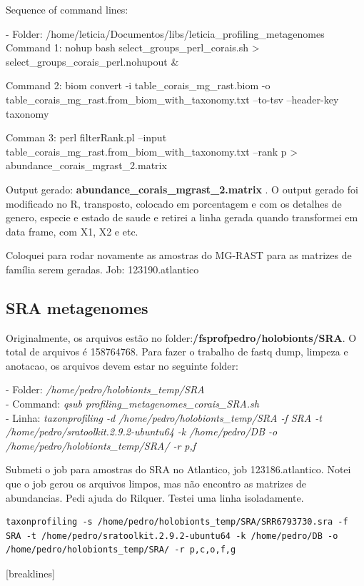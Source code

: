 \documentclass[12pt, a4paper]{report}
\begin{document}
Sequence of command lines:


\begin{tcolorbox}[width=6.7in]
- Folder: /home/leticia/Documentos/libs/leticia\_profiling\_metagenomes \\
Command 1: nohup  bash select\_groups\_perl\_corais.sh > select\_groups\_corais\_perl.nohupout \&

Command 2: biom convert -i table\_corais\_mg\_rast.biom -o table\_corais\_mg\_rast.from\_biom\_with\_taxonomy.txt --to-tsv --header-key taxonomy

Comman 3: perl filterRank.pl --input table\_corais\_mg\_rast.from\_biom\_with\_taxonomy.txt --rank p > abundance\_corais\_mgrast\_2.matrix
\end{tcolorbox}

Output gerado: \textbf{abundance\_corais\_mgrast\_2.matrix} . O output gerado foi modificado no R, transposto, colocado em porcentagem e com os detalhes de genero, especie e estado de saude e retirei a linha gerada quando transformei em data frame, com X1, X2 e etc. 

Coloquei para rodar novamente as amostras do MG-RAST para as matrizes de família serem geradas. Job: 123190.atlantico

\subsection{SRA metagenomes}
Originalmente, os arquivos estão no folder:\textbf {/fsprofpedro/holobionts/SRA}. O total de arquivos é 158764768. Para fazer o trabalho de fastq dump, limpeza e anotacao, os arquivos devem estar no seguinte folder:

\begin{tcolorbox}[width=6.3in]
- Folder: \textit{/home/pedro/holobionts\_temp/SRA} \\
- Command: \textit{qsub profiling\_metagenomes\_corais\_SRA.sh}\\
- Linha: \textit{taxonprofiling -d /home/pedro/holobionts\_temp/SRA -f SRA -t /home/pedro/sratoolkit.2.9.2-ubuntu64 -k /home/pedro/DB -o /home/pedro/holobionts\_temp/SRA/ -r p,f}
\end{tcolorbox}

Submeti o job para amostras do SRA no Atlantico, job 123186.atlantico.  Notei que o job gerou os arquivos limpos, mas não encontro as matrizes de abundancias. Pedi ajuda do Rilquer. Testei uma linha isoladamente. 

\begin{lstlisting}[breaklines]
taxonprofiling -s /home/pedro/holobionts_temp/SRA/SRR6793730.sra -f SRA -t /home/pedro/sratoolkit.2.9.2-ubuntu64 -k /home/pedro/DB -o /home/pedro/holobionts_temp/SRA/ -r p,c,o,f,g
\end{lstlisting}[breaklines]
\end{document}

